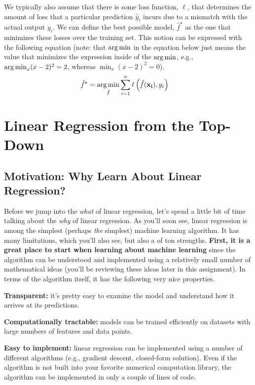 \documentclass[assignment01_Solutions]{subfiles}
\begin{document}
We typically also assume that there is some loss function, $\ell$, that determines the amount of loss that a particular prediction $\hat{y}_i$ incurs due to a mismatch with the actual output $y_i$.  We can define the best possible model, $\hat{f}^\star$ as the one that minimizes these losses over the training set.  This notion can be expressed with the following equation  (note: that $\operatorname*{arg\,min}$ in the equation below just means the value that minimizes the expression inside of the $\operatorname*{arg\,min}$, e.g., $\operatorname*{arg\,min}_{x} (x - 2)^2 = 2$, whereas $\min_{x} (x-2)^2 = 0$).
\begin{align}
\hat{f}^\star &= \operatorname*{arg\,min}_{\hat{f}} \sum_{i=1}^n \ell \left ( \hat{f}(\mathbf{x_i}), y_i \right )
\end{align} 

\section{Linear Regression from the Top-Down}

\subsection*{Motivation: Why Learn About Linear Regression?}
Before we jump into the \emph{what} of linear regression, let's spend a little bit of time talking about the \emph{why} of linear regression.  As you'll soon see, linear regression is among the simplest (perhaps \emph{the} simplest) machine learning algorithm.  It has many limitations, which you'll also see, but also a of ton strengths.  \textbf{First, it is a great place to start when learning about machine learning} since the algorithm can be understood and implemented using a relatively small number of mathematical ideas (you'll be reviewing these ideas later in this assignment).  In terms of the algorithm itself, it has the following very nice properties.

\bi
\item \textbf{Transparent:} it's pretty easy to examine the model and understand how it arrives at its predictions.
\item \textbf{Computationally tractable:} models can be trained efficiently on datasets with large numbers of features and data points.
\item \textbf{Easy to implement:} linear regression can be implemented using a number of different algorithms (e.g., gradient descent, closed-form solution).  Even if the algorithm is not built into your favorite numerical computation library, the algorithm can be implemented in only a couple of lines of code.
\ei
\end{document}
